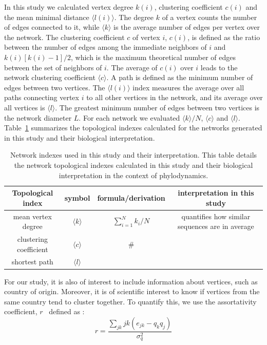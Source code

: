 \documentclass[12pt]{article}
\begin{document}
In this study we calculated vertex degree $k(i)$, clustering coefficient $c(i)$ and the mean minimal distance $\langle l(i)\rangle$.
The degree $k$ of a vertex counts the number of edges connected to it, while $\langle k \rangle$ is the average number of edges per vertex over the network.
The clustering coefficient $c$ of vertex $i$, $c(i)$, is defined as the ratio between the number of edges among the immediate neighbors of $i$ and $k(i)[k(i) -1]/2$, which is the maximum theoretical number of edges between the set of neighbors of $i$.
The average of $c(i)$ over $i$ leads to the network clustering coefficient $\langle c \rangle$.
A path is defined as the minimum number of edges between two vertices.
The $\langle l(i)\rangle$ index measures the average over all paths connecting vertex $i$ to all other vertices in the network, and its average over all vertices is  $\langle l \rangle$.
The greatest minimum number of edges between two vertices is the network diameter $L$.
For each network we evaluated $\langle k \rangle/N$, $\langle c \rangle$ and $\langle l \rangle$.
Table~\ref{tab:concepts} summarizes the topological indexes calculated for the networks generated in this study and their biological interpretation.
\begin{table}
\caption{\footnotesize Network indexes used in this study and their interpretation.
This table details the network topological indexes calculated in this study and their biological interpretation in the context of phylodynamics.}
 \begin{center}
  \begin{tabular}{cccc}
\toprule
Topological index & symbol & formula/derivation & interpretation in this study \\
 \midrule
 mean vertex degree     & $\langle k \rangle$  &$\sum_{i=1}^{N}k_i/N$ & quantifies how similar sequences are in average \\
 clustering coefficient& $\langle c \rangle$  &\#                     &\\
 shortest path         & $\langle l \rangle$  &                    &\\
 \bottomrule
  \end{tabular}
 \end{center}
 \label{tab:concepts}
\end{table}

For our study, it is also of interest to  include information about vertices, such as country of origin. Moreover, it is of scientific interest to know if vertices from the same country tend to cluster together. To quantify this, we use the assortativity coefficient, $r$~\cite{mixing} defined as :
\begin{equation}
 \label{eq:assort}
r = \frac{\sum_{jk} jk(e_{jk}-q_kq_j)}{\sigma_{q}^{2}} 
\end{equation}
\end{document}
